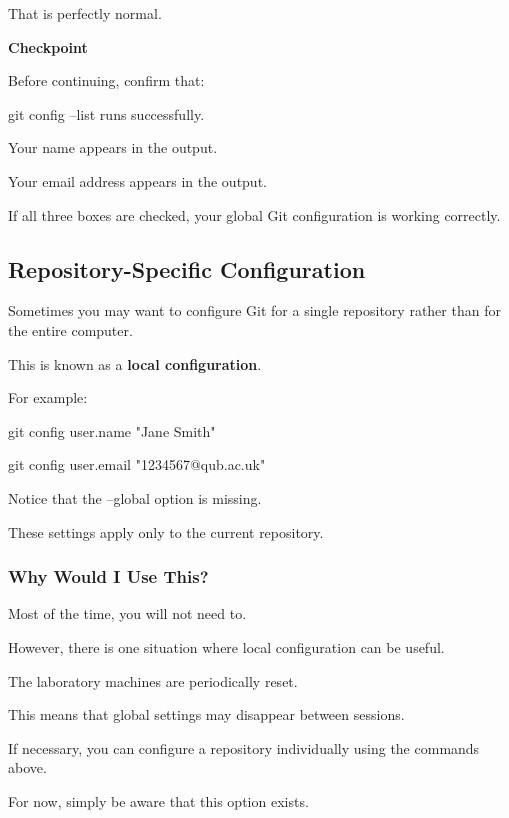 \documentclass{csc2059practical}
\begin{document}
That is perfectly normal.

\begin{reflectionbox}
\textbf{Checkpoint}\par
\medskip

Before continuing, confirm that:


\end{reflectionbox}
\begin{terminalplain}
git config --list runs successfully.
\end{terminalplain}
Your name appears in the output.

Your email address appears in the output.

If all three boxes are checked, your global Git configuration is working correctly.

\subsection{Repository-Specific Configuration}
Sometimes you may want to configure Git for a single repository rather than for the entire computer.

This is known as a \textbf{local configuration}.

For example:

\begin{terminalplain}
git config user.name "Jane Smith"
\end{terminalplain}
\begin{terminalplain}
git config user.email "1234567@qub.ac.uk"
\end{terminalplain}
Notice that the --global option is missing.

These settings apply only to the current repository.

\subsubsection{Why Would I Use This?}
Most of the time, you will not need to.

However, there is one situation where local configuration can be useful.

The laboratory machines are periodically reset.

This means that global settings may disappear between sessions.

If necessary, you can configure a repository individually using the commands above.

For now, simply be aware that this option exists.
\end{document}

